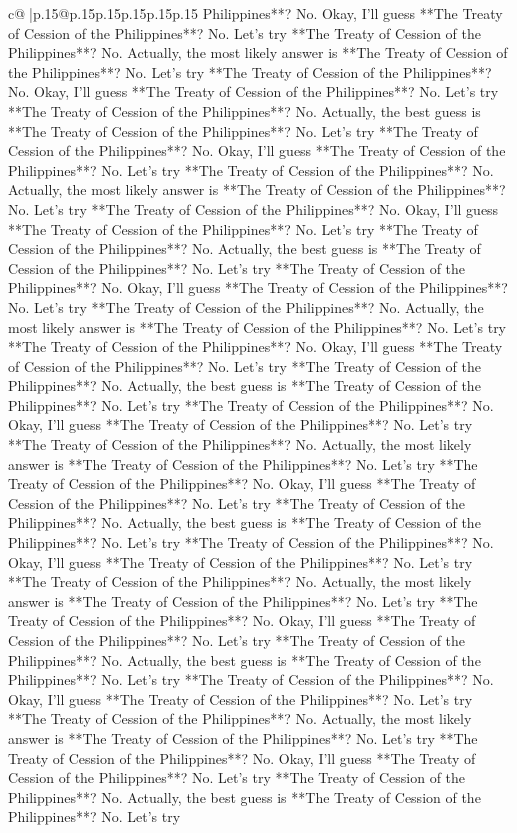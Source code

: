 \documentclass{article}
\begin{document}
{\begin{supertabular}{c@{$\;$}|p{.15\linewidth}@{}p{.15\linewidth}p{.15\linewidth}p{.15\linewidth}p{.15\linewidth}p{.15\linewidth}}
{{{Philippines**? No. Okay, I'll guess **The Treaty of Cession of the Philippines**? No. Let's try **The Treaty of Cession of the Philippines**? No. Actually, the most likely answer is **The Treaty of Cession of the Philippines**? No. Let's try **The Treaty of Cession of the Philippines**? No. Okay, I'll guess **The Treaty of Cession of the Philippines**? No. Let's try **The Treaty of Cession of the Philippines**? No. Actually, the best guess is **The Treaty of Cession of the Philippines**? No. Let's try **The Treaty of Cession of the Philippines**? No. Okay, I'll guess **The Treaty of Cession of the Philippines**? No. Let's try **The Treaty of Cession of the Philippines**? No. Actually, the most likely answer is **The Treaty of Cession of the Philippines**? No. Let's try **The Treaty of Cession of the Philippines**? No. Okay, I'll guess **The Treaty of Cession of the Philippines**? No. Let's try **The Treaty of Cession of the Philippines**? No. Actually, the best guess is **The Treaty of Cession of the Philippines**? No. Let's try **The Treaty of Cession of the Philippines**? No. Okay, I'll guess **The Treaty of Cession of the Philippines**? No. Let's try **The Treaty of Cession of the Philippines**? No. Actually, the most likely answer is **The Treaty of Cession of the Philippines**? No. Let's try **The Treaty of Cession of the Philippines**? No. Okay, I'll guess **The Treaty of Cession of the Philippines**? No. Let's try **The Treaty of Cession of the Philippines**? No. Actually, the best guess is **The Treaty of Cession of the Philippines**? No. Let's try **The Treaty of Cession of the Philippines**? No. Okay, I'll guess **The Treaty of Cession of the Philippines**? No. Let's try **The Treaty of Cession of the Philippines**? No. Actually, the most likely answer is **The Treaty of Cession of the Philippines**? No. Let's try **The Treaty of Cession of the Philippines**? No. Okay, I'll guess **The Treaty of Cession of the Philippines**? No. Let's try **The Treaty of Cession of the Philippines**? No. Actually, the best guess is **The Treaty of Cession of the Philippines**? No. Let's try **The Treaty of Cession of the Philippines**? No. Okay, I'll guess **The Treaty of Cession of the Philippines**? No. Let's try **The Treaty of Cession of the Philippines**? No. Actually, the most likely answer is **The Treaty of Cession of the Philippines**? No. Let's try **The Treaty of Cession of the Philippines**? No. Okay, I'll guess **The Treaty of Cession of the Philippines**? No. Let's try **The Treaty of Cession of the Philippines**? No. Actually, the best guess is **The Treaty of Cession of the Philippines**? No. Let's try **The Treaty of Cession of the Philippines**? No. Okay, I'll guess **The Treaty of Cession of the Philippines**? No. Let's try **The Treaty of Cession of the Philippines**? No. Actually, the most likely answer is **The Treaty of Cession of the Philippines**? No. Let's try **The Treaty of Cession of the Philippines**? No. Okay, I'll guess **The Treaty of Cession of the Philippines**? No. Let's try **The Treaty of Cession of the Philippines**? No. Actually, the best guess is **The Treaty of Cession of the Philippines**? No. Let's try }}}
\end{supertabular}}
\end{document}
